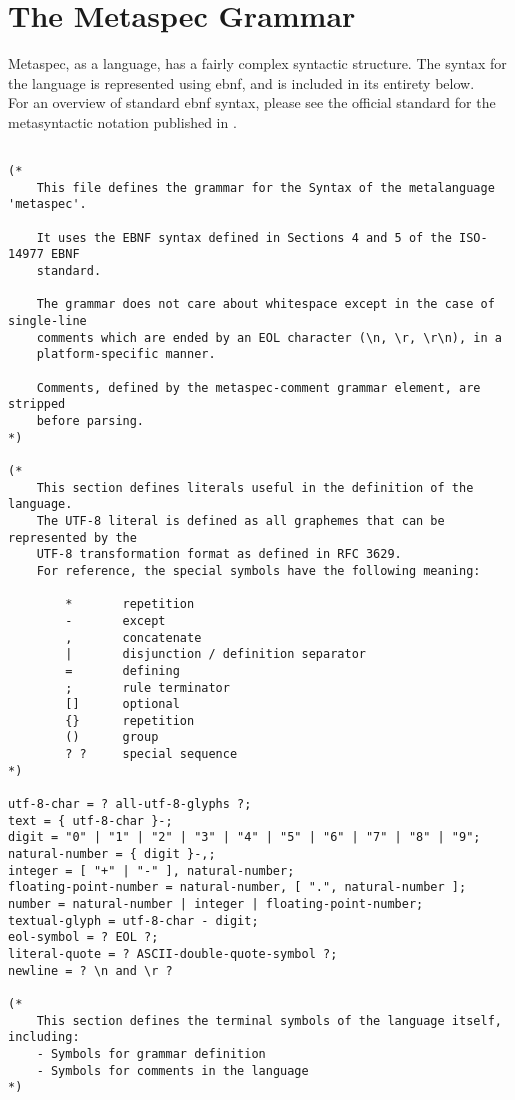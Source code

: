 \chapter{The Metaspec Grammar} %
\label{cha:the_metaspec_grammar}
Metaspec, as a language, has a fairly complex syntactic structure. 
The syntax for the language is represented using \gls{ebnf}, and is included in its entirety below. \\

For an overview of standard \gls{ebnf} syntax, please see the official standard for the metasyntactic notation published in \citet{standard1996ebnf}.

\begin{verbatim}

(*
    This file defines the grammar for the Syntax of the metalanguage 'metaspec'.

    It uses the EBNF syntax defined in Sections 4 and 5 of the ISO-14977 EBNF
    standard.

    The grammar does not care about whitespace except in the case of single-line
    comments which are ended by an EOL character (\n, \r, \r\n), in a
    platform-specific manner.

    Comments, defined by the metaspec-comment grammar element, are stripped 
    before parsing.
*)

(*
    This section defines literals useful in the definition of the language.
    The UTF-8 literal is defined as all graphemes that can be represented by the
    UTF-8 transformation format as defined in RFC 3629.
    For reference, the special symbols have the following meaning:

        *       repetition
        -       except
        ,       concatenate
        |       disjunction / definition separator
        =       defining
        ;       rule terminator
        []      optional
        {}      repetition
        ()      group
        ? ?     special sequence
*)

utf-8-char = ? all-utf-8-glyphs ?;
text = { utf-8-char }-;
digit = "0" | "1" | "2" | "3" | "4" | "5" | "6" | "7" | "8" | "9";
natural-number = { digit }-,;
integer = [ "+" | "-" ], natural-number;
floating-point-number = natural-number, [ ".", natural-number ];
number = natural-number | integer | floating-point-number;
textual-glyph = utf-8-char - digit;
eol-symbol = ? EOL ?;
literal-quote = ? ASCII-double-quote-symbol ?;
newline = ? \n and \r ?

(*
    This section defines the terminal symbols of the language itself, including:
    - Symbols for grammar definition
    - Symbols for comments in the language
*)


\end{verbatim}
